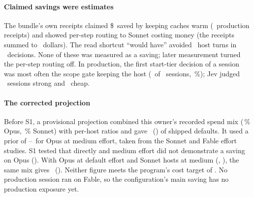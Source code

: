 \paragraph{Claimed savings were estimates} The bundle's own receipts claimed \$\ObKeepaliveUSD\ saved by keeping
caches warm (\ObKeepaliveN\ production receipts) and showed per-step routing to Sonnet costing money (the receipts summed to \ObCheaperUSD\ dollars).
The read shortcut ``would have'' avoided \ObClaimTurns\ host turns in \ObClaimDecisions\ decisions. None of these was
measured as a saving; later measurement turned the per-step routing off. In production, the first start-tier decision
of a session was most often the scope gate keeping the host (\ObStScope\ of \ObStTotal\ sessions,
\ObStScopePct\,\%); Jev judged \ObStJevStrong\ sessions strong and \ObStJevCheap\ cheap.


\paragraph{The corrected projection} Before S1, a provisional projection combined this owner's recorded spend mix
(\AthreeOpusShare\,\% Opus, \AthreeSonnetShare\,\% Sonnet) with per-host ratios and gave \AthreeOld\X\ (\AthreeOldBand)
of shipped defaults. It used a prior of \AthreeOpusPriorLo--\AthreeOpusPriorHi\ for Opus at medium effort, taken from
the Sonnet and Fable effort studies. S1 tested that directly and medium effort did not demonstrate a saving on Opus
(\SHFourRatio\X). With Opus at default effort and Sonnet hosts at medium (\EcRatio, \EcCI), the same mix gives
\AthreeNew\X\ (\AthreeNewBand). Neither figure meets the program's cost target of \AthreeGoal\X. No production session
ran on Fable, so the configuration's main saving has no production exposure yet.
